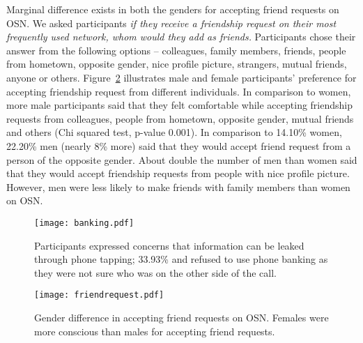 Marginal difference exists in both the genders for accepting friend requests on OSN. We asked participants \emph{if they receive a friendship request on their most frequently used network, whom would they add as friends.} Participants chose their answer from the following options --  colleagues, family members, friends, people from hometown, opposite gender, nice profile picture, strangers, mutual friends, anyone or others. Figure~\ref{fig:FM3} illustrates male and female participants' preference for accepting friendship request from different individuals. In comparison to women, more male participants said that they felt comfortable while accepting friendship requests from colleagues, people from hometown, opposite gender, mutual friends and others (Chi squared test, p-value  0.001). In comparison to 14.10\% women, 22.20\% men (nearly 8\% more) said that they would accept friend request from a person of the opposite gender. About double the number of men than women said that they would accept friendship requests from people with nice profile picture. However, men were less likely to make friends with family members than women on OSN. 

 \begin{figure}[!h]
 \vspace{-6mm}
\begin{center}
\texttt{[image: banking.pdf]}
\vspace{-3mm}
\caption{\small{Participants expressed concerns that information can be leaked through phone tapping; 33.93\% and refused to use phone banking as they were not sure who was on the other side of the call.}}
\label{fig:FPB}
\end{center}
\vspace{-6mm}
\end{figure}



\begin{figure}[!h]
\begin{center}
\texttt{[image: friendrequest.pdf]}
\vspace{-4mm}
\caption{\small{Gender difference in accepting friend requests on OSN. Females were more conscious than males for accepting friend requests.}}
\label{fig:FM3}
\end{center}
\vspace{-6mm}
\end{figure}























